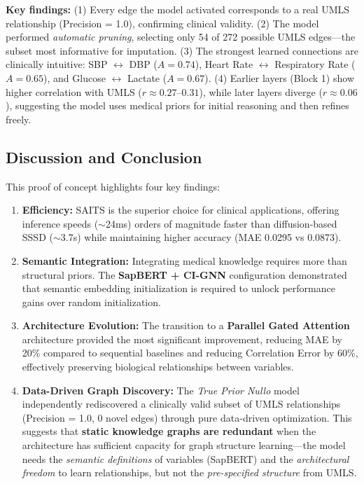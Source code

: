 \textbf{Key findings:} (1) Every edge the model activated corresponds to a real UMLS relationship (Precision = 1.0), confirming clinical validity. (2) The model performed \textit{automatic pruning}, selecting only 54 of 272 possible UMLS edges---the subset most informative for imputation. (3) The strongest learned connections are clinically intuitive: SBP $\leftrightarrow$ DBP ($A=0.74$), Heart Rate $\leftrightarrow$ Respiratory Rate ($A=0.65$), and Glucose $\leftrightarrow$ Lactate ($A=0.67$). (4) Earlier layers (Block 1) show higher correlation with UMLS ($r \approx 0.27$--$0.31$), while later layers diverge ($r \approx 0.06$), suggesting the model uses medical priors for initial reasoning and then refines freely.

\subsection{Discussion and Conclusion}
This proof of concept highlights four key findings:
\begin{enumerate}
    \item \textbf{Efficiency:} SAITS is the superior choice for clinical applications, offering inference speeds ($\sim$24ms) orders of magnitude faster than diffusion-based SSSD ($\sim$3.7s) while maintaining higher accuracy (MAE 0.0295 vs 0.0873).
    \item \textbf{Semantic Integration:} Integrating medical knowledge requires more than structural priors. The \textbf{SapBERT + CI-GNN} configuration demonstrated that semantic embedding initialization is required to unlock performance gains over random initialization.
    \item \textbf{Architecture Evolution:} The transition to a \textbf{Parallel Gated Attention} architecture provided the most significant improvement, reducing MAE by 20\% compared to sequential baselines and reducing Correlation Error by 60\%, effectively preserving biological relationships between variables.
    \item \textbf{Data-Driven Graph Discovery:} The \textit{True Prior Nullo} model independently rediscovered a clinically valid subset of UMLS relationships (Precision = 1.0, 0 novel edges) through pure data-driven optimization. This suggests that \textbf{static knowledge graphs are redundant} when the architecture has sufficient capacity for graph structure learning---the model needs the \textit{semantic definitions} of variables (SapBERT) and the \textit{architectural freedom} to learn relationships, but not the \textit{pre-specified structure} from UMLS.
\end{enumerate}